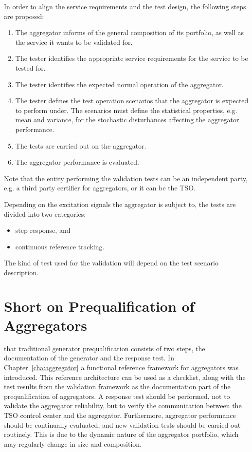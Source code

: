 In order to align the service requirements and the test design, the following steps are proposed:
\begin{enumerate}
	\item The aggregator informs of the general composition of its portfolio, as well as the service it wants to be validated for.
	\item The tester identifies the appropriate service requirements for the service to be tested for.
	\item The tester identifies the expected normal operation of the aggregator.
	\item The tester defines the test operation scenarios that the aggregator is expected to perform under. The scenarios must define the statistical properties, e.g. mean and variance, for the stochastic disturbances affecting the aggregator performance.
	\item The tests are carried out on the aggregator.
	\item The aggregator performance is evaluated.	
\end{enumerate}

Note that the entity performing the validation tests can be an independent party, e.g. a third party certifier for aggregators, or it can be the TSO.

Depending on the excitation signals the aggregator is subject to, the tests are divided into two categories:
\begin{itemize}
	\item step response, and
	\item continuous reference tracking.
\end{itemize}
The kind of test used for the validation will depend on the test scenario description.

\section{Short on Prequalification of Aggregators}
 that traditional generator prequalification consists of two steps, the documentation of the generator and the response test. In Chapter~\ref{cha:aggregator} a functional reference framework for aggregators was introduced. This reference architecture can be used as a checklist, along with the test results from the validation framework as the documentation part of the prequalification of aggregators. A response test should be performed, not to validate the aggregator reliability, but to verify the communication between the TSO control center and the aggregator. Furthermore, aggregator performance should be continually evaluated, and new validation tests should be carried out routinely. This is due to the dynamic nature of the aggregator portfolio, which may regularly change in size and composition.

